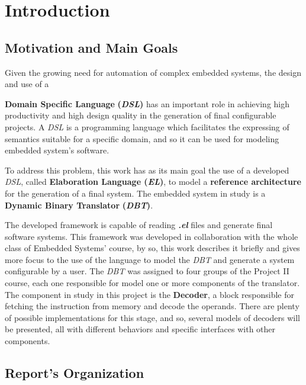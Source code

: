\documentclass[12pt]{article}
\begin{document}
\newpage
\section{Introduction}
\subsection{Motivation and Main Goals}

Given the growing need for automation of complex embedded systems, the design and use of a {\textbf{Domain Specific Language} \textbf{(\textit{DSL})} has an important role in achieving high productivity and high design quality in the generation of final configurable projects. A \textit{DSL} is a programming language which facilitates the expressing of semantics suitable for a specific domain, and so it can be used for modeling embedded system's software. 

To address this problem, this work has as its main goal the use of a developed \textit{DSL}, called \textbf{Elaboration Language (\textit{EL})}, to model a \textbf{reference architecture} for the generation of a final system. The embedded system in study is a \textbf{Dynamic Binary Translator} \textbf{(\textit{DBT})}.

The developed framework is capable of reading \textbf{\textit{.el}} files and generate final software systems. This framework was developed in collaboration with the whole class of Embedded Systems' course, by so, this work describes it briefly and gives more focus to the use of the language to model the \textit{DBT} and generate a system configurable by a user. The \textit{DBT} was assigned to four groups of the Project II course, each one responsible for model one or more components of the translator. The component in study in this project is the \textbf{Decoder}, a block responsible for fetching the instruction from memory and decode the operands. There are plenty of possible implementations for this stage, and so, several models of decoders will be presented, all with different behaviors and specific interfaces with other components.

\subsection{Report's Organization}

}
\end{document}
